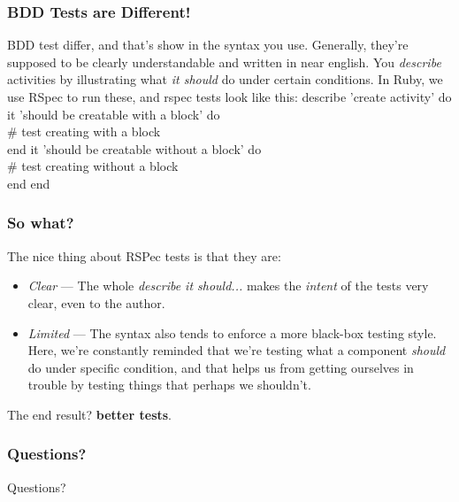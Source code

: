 \documentclass[t, 10pt]{beamer}
\begin{document}
\begin{frame}
\frametitle{BDD Tests are Different!}
BDD test differ, and that's show in the syntax you use.  Generally, they're supposed to be clearly understandable and written in near english.  You \textit{describe} activities by illustrating what \textit{it should} do under certain conditions.
\newline
\newline
In Ruby, we use RSpec to run these, and rspec tests look like this:
\newline
\newline
describe 'create activity' do
\newline
\newline
  it 'should be creatable with a block' do \\
    \# test creating with a block \\
  end
\newline
\newline
  it 'should be creatable without a block' do \\
    \# test creating without a block \\
  end
\newline
\newline
end
\end{frame}

\begin{frame}
\frametitle{So what?}
The nice thing about RSPec tests is that they are:
\begin{itemize}
\item \textit{Clear} --- The whole \textit{describe it should...} makes the \textit{intent} of the tests very clear, even to the author.
\item \textit{Limited} --- The syntax also tends to enforce a more black-box testing style.  Here, we're constantly reminded that we're testing what a component \textit{should} do under specific condition, and that helps us from getting ourselves in trouble by testing things that perhaps we shouldn't.
\end{itemize}
The end result? \textbf{better tests}.
\end{frame}

\begin{frame}
\frametitle{Questions?}
\begin{center}
Questions?
\end{center}
\end{frame}
\end{document}
